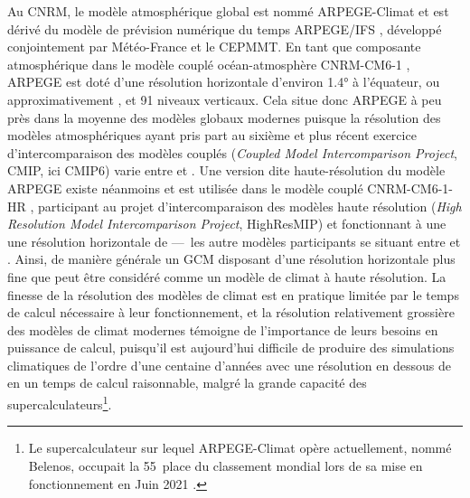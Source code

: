 \documentclass[../main.tex]{subfiles}
\begin{document}
Au CNRM, le modèle atmosphérique global est nommé ARPEGE-Climat \parencite[Action de Recherche Petite Échelle Grande Échelle,][]{deque_arpege_1994} et est
dérivé du modèle de prévision numérique du temps ARPEGE/IFS \parencite[\textit{Integrated Forecast System},][]{courtier_arpege_1991}, développé conjointement
par Météo-France et le CEPMMT. En tant que composante atmosphérique dans le modèle couplé océan-atmosphère \nolinebreak CNRM-CM6-1
\parencite{voldoire_evaluation_2019}, ARPEGE est doté d'une résolution horizontale d'environ \ang{1.4} à l'équateur, ou approximativement , et \num{91}
niveaux verticaux. Cela situe donc ARPEGE à peu près dans la moyenne des modèles globaux modernes puisque la résolution des modèles atmosphériques ayant pris
part au sixième et plus récent exercice d'intercomparaison des modèles couplés (\textit{Coupled Model Intercomparison Project}, CMIP, ici CMIP6)
\parencite{eyring_overview_2016} varie entre  et  \parencite[][Tableau AII.5]{ipcc_annex_2021}. Une version dite haute-résolution du modèle
ARPEGE existe néanmoins et est utilisée dans le modèle couplé CNRM-CM6-1-HR \parencite{saint-martin_tracking_2021}, participant au projet d'intercomparaison des
modèles haute résolution (\textit{High Resolution Model Intercomparison Project}, HighResMIP) \parencite{haarsma_high_2016} et fonctionnant à une une résolution
horizontale de  ---~les autre modèles participants se situant entre  et  \parencite[][Tableau AII.6]{ipcc_annex_2021}. Ainsi, de manière
générale un GCM disposant d'une résolution horizontale plus fine que  peut être considéré comme un modèle de climat à haute résolution. La finesse de la
résolution des modèles de climat est en pratique limitée par le temps de calcul nécessaire à leur fonctionnement, et la résolution relativement grossière des
modèles de climat modernes témoigne de l'importance de leurs besoins en puissance de calcul, puisqu'il est aujourd'hui difficile de produire des simulations
climatiques de l'ordre d'une centaine d'années avec une résolution en dessous de  en un temps de calcul raisonnable, malgré la grande capacité des
supercalculateurs\footnote{Le supercalculateur sur lequel ARPEGE-Climat opère actuellement, nommé Belenos, occupait la \num{55}\ieme~place du classement mondial
lors de sa mise en fonctionnement en Juin \num{2021} \parencite{belenos_top500}.}.
\end{document}
